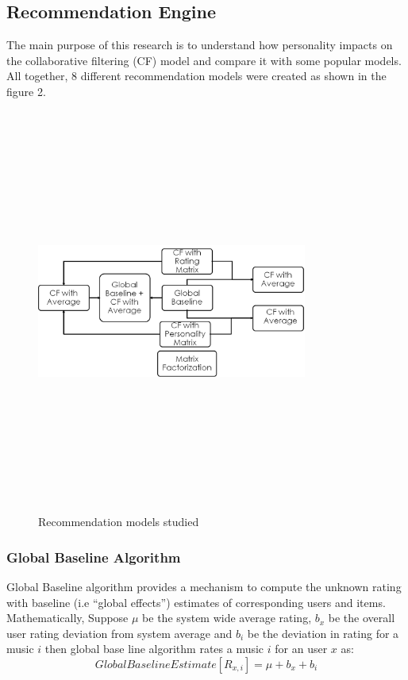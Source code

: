 \documentclass[conference]{IEEEtran}
\begin{document}
\subsection{Recommendation Engine}
The main purpose of this research is to understand how personality impacts on the collaborative filtering (CF) model and compare it with some popular models. All together, 8 different recommendation models were created as shown in the figure 2.
\begin{figure}[!h]
\centering
\includegraphics[width=3.5in,height=5.25in,clip,keepaspectratio]{recommendation_models.png}
\caption{Recommendation models studied}
\label{fig:2}
\end{figure}

\subsubsection{Global Baseline Algorithm}
Global Baseline algorithm provides a mechanism to compute the unknown rating with baseline (i.e ``global effects'') estimates of corresponding users and items.
Mathematically,
Suppose $\mu$ be the system wide average rating, $b_x$ be the overall user rating deviation from system average and $b_i$ be the deviation in rating for a music $i$ then global base line algorithm rates a music $i$ for an user $x$ as:
\begin{equation}\label{eq:baseline}
  Global Baseline Estimate[R_{x,i}] = \mu + b_x + b_i
\end{equation}
\end{document}
